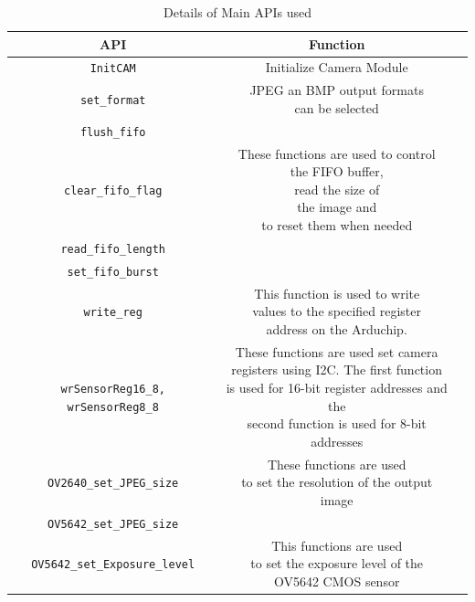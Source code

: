 \begin{table}[]
\centering
\caption{ Details of Main APIs used}
\label{tbl:camera_apis}
\begin{tabular}{|c|c|c|}
\hline
API & Function \\
\hline
\texttt{InitCAM} & Initialize Camera Module\\
\hline
\texttt{set\_format} & \makecell{JPEG an BMP output formats \\can be selected}\\
\hline
\texttt{flush\_fifo} &  \\
\texttt{clear\_fifo\_flag} & \makecell{These functions are used to control \\the FIFO buffer, \\read the size of \\the image  and \\to reset them when needed}  \\
\texttt{read\_fifo\_length} & \\ 
\texttt{set\_fifo\_burst} & \\ 
\hline
\texttt{write\_reg} & \makecell{This function is used to write \\values to the specified register\\ address on the Arduchip.}\\
\hline
\texttt{wrSensorReg16\_8, wrSensorReg8\_8} & \makecell{These functions are used set camera \\ registers using I2C. The first function \\ is used for 16-bit register addresses and the \\second function is used for 8-bit addresses}  \\
\hline
\texttt{OV2640\_set\_JPEG\_size} & \makecell{These functions are used \\to set the resolution of the output image } \\
\texttt{OV5642\_set\_JPEG\_size} & \\
\hline
\texttt{OV5642\_set\_Exposure\_level} & \makecell{This functions are used \\to set the exposure level of the \\OV5642 CMOS sensor}\\
\hline
\end{tabular}
\end{table}
